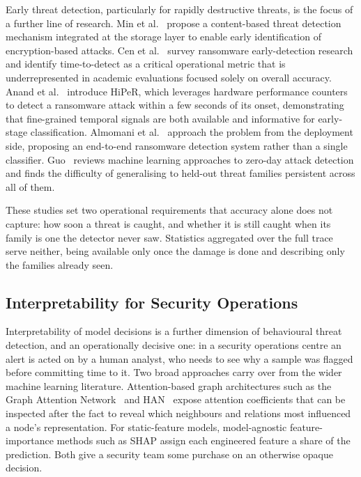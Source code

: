 \documentclass[%
    BCOR=10mm,
    DIV=13,
    toc=bibliography,
    toc=listof,
    oneside,
    12pt,
]{scrbook}
\begin{document}
Early threat detection, particularly for rapidly destructive threats, is the
focus of a further line of research. Min et al.~\cite{min2018content} propose a
content-based threat detection mechanism integrated at the storage layer to
enable early identification of encryption-based attacks. Cen et
al.~\cite{cen2021ransomware} survey ransomware early-detection research and
identify time-to-detect as a critical operational metric that is
underrepresented in academic evaluations focused solely on overall accuracy.
Anand et al.~\cite{anand2022hiper} introduce HiPeR, which leverages hardware
performance counters to detect a ransomware attack within a few seconds of its
onset, demonstrating that fine-grained temporal signals are both available and
informative for early-stage classification. Almomani et al.~\cite{almomani2021}
approach the problem from the deployment side, proposing an end-to-end
ransomware detection system rather than a single classifier.
Guo~\cite{guo2023zeroday} reviews machine learning approaches to zero-day
attack detection and finds the difficulty of generalising to held-out threat
families persistent across all of them.

These studies set two operational requirements that accuracy alone does not
capture: how soon a threat is caught, and whether it is still caught when its
family is one the detector never saw. Statistics aggregated over the full
trace serve neither, being available only once the damage is done and
describing only the families already seen.

\subsection{Interpretability for Security Operations}
\label{subsec:interpretability}

Interpretability of model decisions is a further dimension of behavioural threat
detection, and an operationally decisive one: in a security operations centre an
alert is acted on by a human analyst, who needs to see why a sample was flagged
before committing time to it. Two broad approaches carry over from the wider machine
learning literature. Attention-based graph architectures such as the Graph Attention
Network~\cite{velickovic2018gat} and HAN~\cite{han2019} expose attention coefficients
that can be inspected after the fact to reveal which neighbours and relations most
influenced a node's representation. For static-feature models, model-agnostic
feature-importance methods such as SHAP assign each engineered feature a share of the
prediction. Both give a security team some purchase on an otherwise opaque decision.
\end{document}
